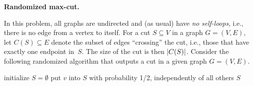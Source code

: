 \documentclass[11pt,addpoints,answers]{exam}
\newcommand{\MaxCut}{\textsc{MaxCut}}
\begin{document}
\begin{questions}

  \question \textbf{Randomized max-cut.}

  In this problem, all graphs are undirected and (as usual) have \emph{no self-loops}, i.e., there is no edge from a vertex to itself.
  For a cut $S \subseteq V$ in a graph $G=(V,E)$, let $C(S) \subseteq E$ denote the subset of edges ``crossing'' the cut, i.e., those that have exactly one endpoint in~$S$.
  The size of the cut is then $\lvert C(S)\rvert$.
  Consider the following randomized algorithm that outputs a cut in a given graph $G=(V,E)$.
  
    \begin{algorithm}[H]
      \begin{algorithmic}[1]
        \State initialize $S = \emptyset$
        \State put $v$ into $S$ with probability 1/2, independently of all others
        \EndFor
        \State \Return $S$
      \end{algorithmic}
    \end{algorithm}    
  
\end{questions}
\end{document}
